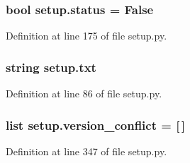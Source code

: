 \subsubsection[{\texorpdfstring{status}{status}}]{\setlength{\rightskip}{0pt plus 5cm}bool setup.\+status = False}\hypertarget{namespacesetup_ab82b87b5daf568d1c5c3c8fc41e52ca1}{}\label{namespacesetup_ab82b87b5daf568d1c5c3c8fc41e52ca1}


Definition at line 175 of file setup.\+py.

\subsubsection[{\texorpdfstring{txt}{txt}}]{\setlength{\rightskip}{0pt plus 5cm}string setup.\+txt}\hypertarget{namespacesetup_a2429357b780b7445dd4831250478d9ed}{}\label{namespacesetup_a2429357b780b7445dd4831250478d9ed}


Definition at line 86 of file setup.\+py.

\subsubsection[{\texorpdfstring{version\+\_\+conflict}{version_conflict}}]{\setlength{\rightskip}{0pt plus 5cm}list setup.\+version\+\_\+conflict = \mbox{[}$\,$\mbox{]}}\hypertarget{namespacesetup_a29c6bb44f4b88076bbd129b6114c9fd2}{}\label{namespacesetup_a29c6bb44f4b88076bbd129b6114c9fd2}


Definition at line 347 of file setup.\+py.

